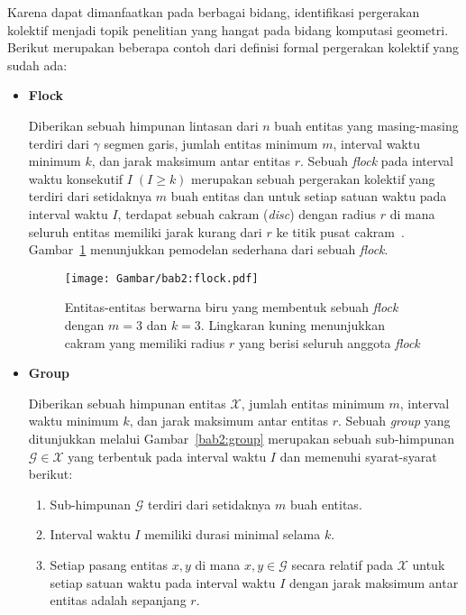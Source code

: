 Karena dapat dimanfaatkan pada berbagai bidang, identifikasi pergerakan kolektif menjadi topik penelitian yang hangat pada bidang komputasi geometri. Berikut merupakan beberapa contoh dari definisi formal pergerakan kolektif yang sudah ada:

\begin{itemize}
    \item \textbf{Flock}
    
    Diberikan sebuah himpunan lintasan dari $n$ buah entitas yang masing-masing terdiri dari $\gamma$ segmen garis, jumlah entitas minimum $m$, interval waktu minimum $k$, dan jarak maksimum antar entitas $r$. Sebuah \textit{flock} pada interval waktu konsekutif $I\;(I \geq k)$ merupakan sebuah pergerakan kolektif yang terdiri dari setidaknya $m$ buah entitas dan untuk setiap satuan waktu pada interval waktu $I$, terdapat sebuah cakram (\textit{disc}) dengan radius $r$ di mana seluruh entitas memiliki jarak kurang dari $r$ ke titik pusat cakram~\cite{gudmundsson:flock}. Gambar~\ref{bab2:flock} menunjukkan pemodelan sederhana dari sebuah \textit{flock}.
    
    \begin{figure}[h]
        \centering
        \captionsetup{width=0.75\textwidth}
        \texttt{[image: Gambar/bab2:flock.pdf]}
        \caption[Sebuah \textit{flock}]{Entitas-entitas berwarna biru yang membentuk sebuah \textit{flock} dengan $m = 3$ dan $k = 3$. Lingkaran kuning menunjukkan cakram yang memiliki radius $r$ yang berisi seluruh anggota \textit{flock}}
        \label{bab2:flock}
    \end{figure}

    \item \textbf{Group}
    
    Diberikan sebuah himpunan entitas $\mathcal{X}$, jumlah entitas minimum $m$, interval waktu minimum $k$, dan jarak maksimum antar entitas $r$. Sebuah \textit{group} yang ditunjukkan melalui Gambar~\ref{bab2:group} merupakan sebuah sub-himpunan $\mathcal{G} \in \mathcal{X}$ yang terbentuk pada interval waktu $I$ dan memenuhi syarat-syarat berikut:
    
    \begin{enumerate}
        \item Sub-himpunan $\mathcal{G}$ terdiri dari setidaknya $m$ buah entitas.
        \item Interval waktu $I$ memiliki durasi minimal selama $k$.
        \item Setiap pasang entitas $x, y$ di mana $x, y \in \mathcal{G}$ secara relatif pada $\mathcal{X}$ untuk setiap satuan waktu pada interval waktu $I$ dengan jarak maksimum antar entitas adalah sepanjang $r$.
    \end{enumerate}
    

\end{itemize}
